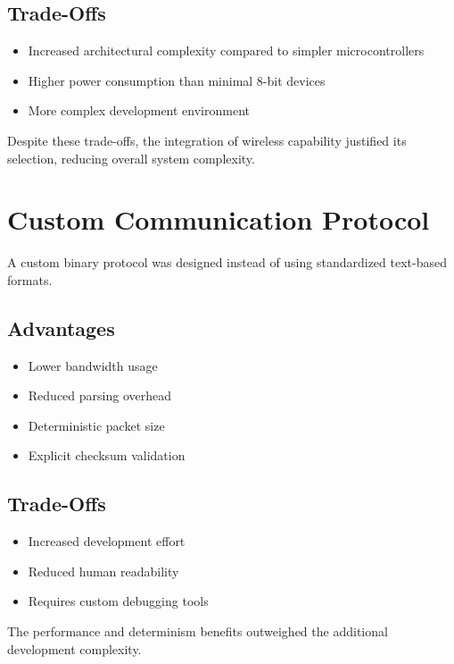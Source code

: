 \subsection{Trade-Offs}

\begin{itemize}
	\item Increased architectural complexity compared to simpler microcontrollers
	\item Higher power consumption than minimal 8-bit devices
	\item More complex development environment
\end{itemize}

Despite these trade-offs, the integration of wireless capability justified its selection, reducing overall system complexity.


\section{Custom Communication Protocol}

A custom binary protocol was designed instead of using standardized text-based formats.

\subsection{Advantages}

\begin{itemize}
	\item Lower bandwidth usage
	\item Reduced parsing overhead
	\item Deterministic packet size
	\item Explicit checksum validation
\end{itemize}

\subsection{Trade-Offs}

\begin{itemize}
	\item Increased development effort
	\item Reduced human readability
	\item Requires custom debugging tools
\end{itemize}

The performance and determinism benefits outweighed the additional development complexity.

